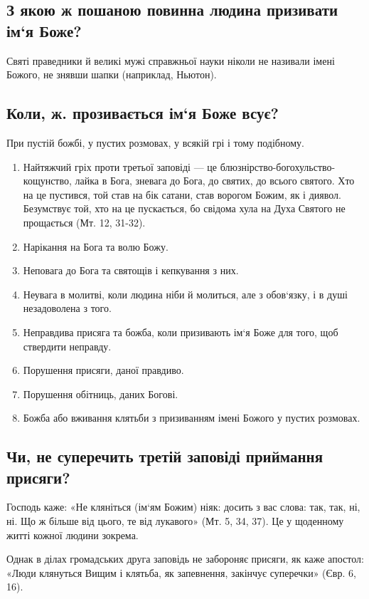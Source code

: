 \documentclass[main.tex]{subfiles}
\begin{document}
\subsection{З якою ж пошаною повинна людина призивати ім`я Боже?}

Святі праведники й великі мужі справжньої науки ніколи не називали імені Божого, не знявши шапки (наприклад, Ньютон).

\subsection{Коли, ж. прозивається ім`я Боже всує?}

При пустій божбі, у пустих розмовах, у всякій грі і тому подібному.

\begin{enumerate}
    \item Найтяжчий гріх проти третьої заповіді — це блюзнірство-богохульство-кощунство, лайка в Бога, зневага до Бога, до святих, до всього святого. Хто на це пустився, той став на бік сатани, став ворогом Божим, як і диявол. Безумствує той, хто на це пускається, бо свідома хула на Духа Святого не прощається (Мт. 12, 31-32).
    \item Нарікання на Бога та волю Божу.
    \item Неповага до Бога та святощів і кепкування з них.
    \item Неувага в молитві, коли людина ніби й молиться, але з обов`язку, і в душі незадоволена з того.
    \item Неправдива присяга та божба, коли призивають ім`я Боже для того, щоб ствердити неправду.
    \item Порушення присяги, даної правдиво.
    \item Порушення обітниць, даних Богові.
    \item Божба або вживання клятьби з призиванням імені Божого у пустих розмовах.
\end{enumerate}

\subsection{Чи, не суперечить третій заповіді приймання присяги?}

Господь каже: «Не кляніться (ім`ям Божим) ніяк: досить з вас слова: так, так, ні, ні. Що ж більше від цього, те від лукавого» (Мт. 5, 34, 37). Це у щоденному житті кожної людини зокрема.

Однак в ділах громадських друга заповідь не забороняє присяги, як каже апостол: «Люди клянуться Вищим і клятьба, як запевнення, закінчує суперечки» (Євр. 6, 16).
 
\end{document}

